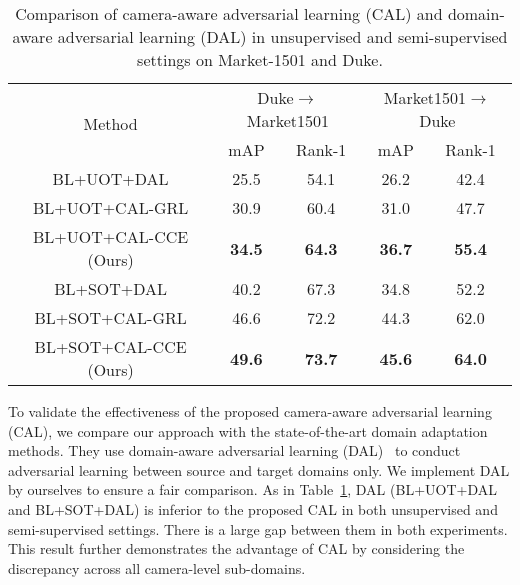 \documentclass[10pt,twocolumn,letterpaper]{article}
\begin{document}
\begin{table}[htbp]
 \centering
 \caption{Comparison of camera-aware adversarial learning (CAL) and domain-aware adversarial learning (DAL) in unsupervised and semi-supervised settings on Market-1501 and Duke.}
 \begin{adjustbox}{width=0.48\textwidth}
   \begin{tabular}{|c|cc|cc|}
   \toprule
   \multirow{2}[2]{*}{Method} & \multicolumn{2}{c|}{Duke$\rightarrow$Market1501} & \multicolumn{2}{c|}{Market1501$\rightarrow$Duke} \\
\cmidrule{2-5}         & mAP  & Rank-1 & mAP  & Rank-1 \\
   \midrule
   BL+UOT+DAL & 25.5 & 54.1 & 26.2 & 42.4 \\
   \midrule
   BL+UOT+CAL-GRL & 30.9 & 60.4 & 31.0 & 47.7 \\
   BL+UOT+CAL-CCE (Ours) & \textcolor[rgb]{ 1, 0, 0}{\textbf{34.5}} & \textcolor[rgb]{ 1, 0, 0}{\textbf{64.3}} & \textcolor[rgb]{ 1, 0, 0}{\textbf{36.7}} & \textcolor[rgb]{ 1, 0, 0}{\textbf{55.4}} \\
   \midrule
   \midrule
  BL+SOT+DAL & 40.2 & 67.3 & 34.8 & 52.2 \\
  \midrule
  BL+SOT+CAL-GRL & 46.6 & 72.2 & 44.3 & 62.0 \\
  BL+SOT+CAL-CCE (Ours) & \textcolor[rgb]{ 1, 0, 0}{\textbf{49.6}} & \textcolor[rgb]{ 1, 0, 0}{\textbf{73.7}} & \textcolor[rgb]{ 1, 0, 0}{\textbf{45.6}} & \textcolor[rgb]{ 1, 0, 0}{\textbf{64.0}} \\
   \bottomrule
   \end{tabular}\end{adjustbox}{}
 \label{tab03}\vspace*{-10pt}
\end{table}

To validate the effectiveness of the proposed camera-aware adversarial learning (CAL), we compare our approach with the state-of-the-art domain adaptation methods. They use domain-aware adversarial learning (DAL)~\cite{DBLP:conf/icml/GaninL15,DBLP:conf/cvpr/TzengHSD17} to conduct adversarial learning between source and target domains only. We implement DAL by ourselves to ensure a fair comparison. As in Table~\ref{tab03}, DAL (BL+UOT+DAL and BL+SOT+DAL) is inferior to the proposed CAL in both unsupervised and semi-supervised settings. There is a large gap between them in both experiments. This result further demonstrates the advantage of CAL by considering the discrepancy across all camera-level sub-domains.
 
\end{document}
